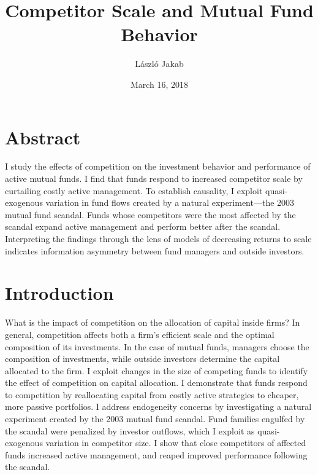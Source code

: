 \documentclass[openany]{book}
\title{Competitor Scale and Mutual Fund Behavior}
\author{László Jakab}
\date{March 16, 2018}
\theoremstyle{definition}
\theoremstyle{definition}
\theoremstyle{definition}
\theoremstyle{remark}
\begin{document}
\maketitle

{
\setcounter{tocdepth}{1}
\tableofcontents
}
\chapter*{Abstract}\label{abstract}

I study the effects of competition on the investment behavior and
performance of active mutual funds. I find that funds respond to
increased competitor scale by curtailing costly active management. To
establish causality, I exploit quasi-exogenous variation in fund flows
created by a natural experiment---the 2003 mutual fund scandal. Funds
whose competitors were the most affected by the scandal expand active
management and perform better after the scandal. Interpreting the
findings through the lens of models of decreasing returns to scale
indicates information asymmetry between fund managers and outside
investors.

\chapter{Introduction}\label{introduction}

What is the impact of competition on the allocation of capital inside
firms? In general, competition affects both a firm's efficient scale and
the optimal composition of its investments. In the case of mutual funds,
managers choose the composition of investments, while outside investors
determine the capital allocated to the firm. I exploit changes in the
size of competing funds to identify the effect of competition on capital
allocation. I demonstrate that funds respond to competition by
reallocating capital from costly active strategies to cheaper, more
passive portfolios. I address endogeneity concerns by investigating a
natural experiment created by the 2003 mutual fund scandal. Fund
families engulfed by the scandal were penalized by investor outflows,
which I exploit as quasi-exogenous variation in competitor size. I show
that close competitors of affected funds increased active management,
and reaped improved performance following the scandal.
\end{document}
